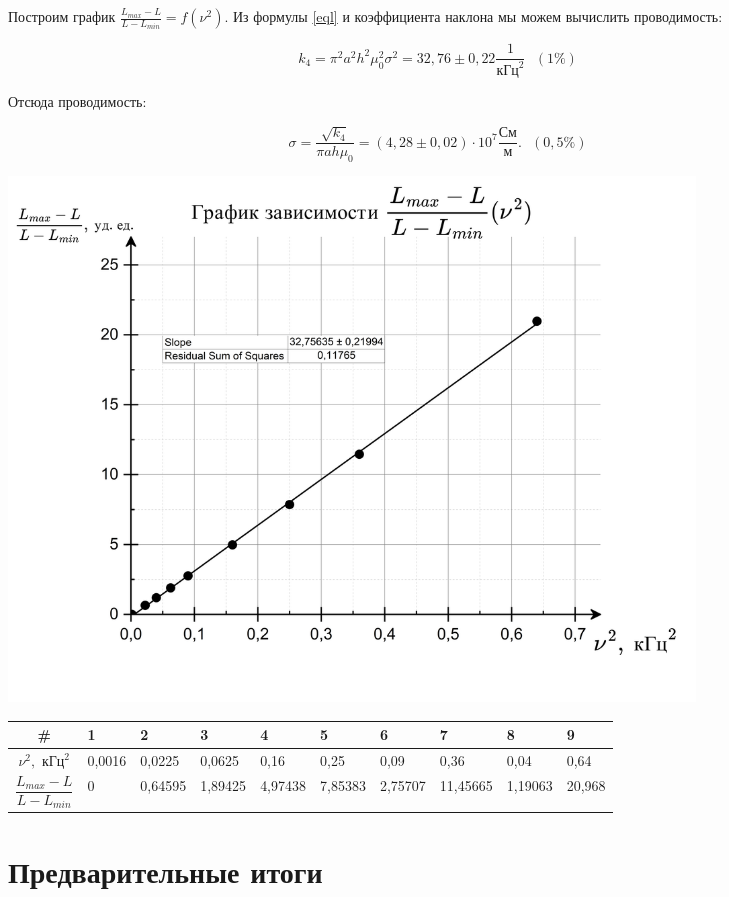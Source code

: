 \documentclass[a4paper,12pt]{article}
\theoremstyle{plain} %
\theoremstyle{definition} %
\theoremstyle{remark} %
\begin{document}
Построим график $\frac{L_{max} - L}{L - L_{min}} = f(\nu^2)$. Из формулы \eqref{eql}  и коэффициента наклона мы можем						вычислить проводимость:

\begin{equation}
	k_4 = \pi^2 a^2 h^ 2 \mu_0^2 \sigma^2 = 32,76 \pm 0,22 \frac{1}{\text{кГц}^2} \ \ \ (1\%)
\end{equation}

Отсюда проводимость:

\begin{equation}
	\sigma = \frac{\sqrt{k_4}}{\pi a h \mu_0} = (4,28 \pm 0,02) \cdot 10^7  \frac{\text{См}}{\text{м}}. \ \ \  (0,5\%)
\end{equation}

						\includegraphics[width = 0.8\textwidth]{llv}
						
											\begin{table}[h]
			\begin{tabularx}{\textwidth}{|c|Y|Y|Y|Y|Y|Y|Y|Y|Y|}
				\hline
				\# & 1 & 2 & 3 & 4 & 5 & 6 & 7 & 8 & 9  \\ \hline
				$\nu^2, \text{ кГц}^2$ & 0,0016&				0,0225&				0,0625&				0,16&				0,25&				0,09&				0,36&				0,04&				0,64 \\ \hline
				$\dfrac{L_{max} - L}{L - L_{min}}$ & 0&				0,64595&				1,89425&				4,97438&				7,85383&				2,75707&				11,45665&				1,19063&				20,968\\ \hline

			\end{tabularx}
			\label{tab:my-table5}
		\end{table}	
		
		\section{Предварительные итоги}
		
\end{document}
